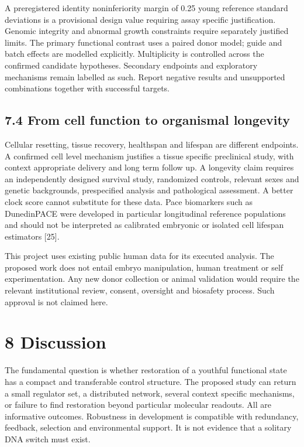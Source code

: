 \documentclass[
  11pt,
  letterpaper,
]{article}
\begin{document}
A preregistered identity noninferiority margin of 0.25 young reference
standard deviations is a provisional design value requiring assay
specific justification. Genomic integrity and abnormal growth
constraints require separately justified limits. The primary functional
contrast uses a paired donor model; guide and batch effects are modelled
explicitly. Multiplicity is controlled across the confirmed candidate
hypotheses. Secondary endpoints and exploratory mechanisms remain
labelled as such. Report negative results and unsupported combinations
together with successful targets.

\hypertarget{from-cell-function-to-organismal-longevity}{%
\subsection{7.4 From cell function to organismal
longevity}\label{from-cell-function-to-organismal-longevity}}

Cellular resetting, tissue recovery, healthspan and lifespan are
different endpoints. A confirmed cell level mechanism justifies a tissue
specific preclinical study, with context appropriate delivery and long
term follow up. A longevity claim requires an independently designed
survival study, randomized controls, relevant sexes and genetic
backgrounds, prespecified analysis and pathological assessment. A better
clock score cannot substitute for these data. Pace biomarkers such as
DunedinPACE were developed in particular longitudinal reference
populations and should not be interpreted as calibrated embryonic or
isolated cell lifespan estimators {[}25{]}.

This project uses existing public human data for its executed analysis.
The proposed work does not entail embryo manipulation, human treatment
or self experimentation. Any new donor collection or animal validation
would require the relevant institutional review, consent, oversight and
biosafety process. Such approval is not claimed here.

\hypertarget{discussion}{%
\section{8 Discussion}\label{discussion}}

The fundamental question is whether restoration of a youthful functional
state has a compact and transferable control structure. The proposed
study can return a small regulator set, a distributed network, several
context specific mechanisms, or failure to find restoration beyond
particular molecular readouts. All are informative outcomes. Robustness
in development is compatible with redundancy, feedback, selection and
environmental support. It is not evidence that a solitary DNA switch
must exist.
\end{document}
